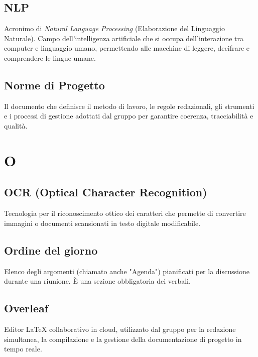 \documentclass[a4paper, 11pt, oneside]{scrartcl} %
\begin{document}
\subsection*{NLP}
Acronimo di \textit{Natural Language Processing} (Elaborazione del Linguaggio Naturale). Campo dell'intelligenza artificiale che si occupa dell'interazione tra computer e linguaggio umano, permettendo alle macchine di leggere, decifrare e comprendere le lingue umane.
\vspace{0.5cm}

\subsection*{Norme di Progetto}


Il documento che definisce il metodo di lavoro, le regole redazionali, gli strumenti e i processi di gestione adottati dal gruppo per garantire coerenza, tracciabilità e qualità.

\vspace{0.5cm}


\section*{O}


\subsection*{OCR (Optical Character Recognition)}
Tecnologia per il riconoscimento ottico dei caratteri che permette di convertire immagini o documenti scansionati in testo digitale modificabile.
\subsection*{Ordine del giorno}


Elenco degli argomenti (chiamato anche "Agenda") pianificati per la discussione durante una riunione. È una sezione obbligatoria dei verbali.

\subsection*{Overleaf}
Editor LaTeX collaborativo in cloud, utilizzato dal gruppo per la redazione simultanea, la compilazione e la gestione della documentazione di progetto in tempo reale.
\vspace{0.5cm}
\end{document}
